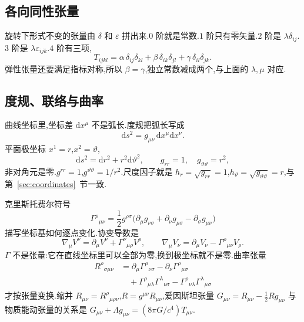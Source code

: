 \subsection{各向同性张量}
旋转下形式不变的张量由 $\delta$ 和 $\varepsilon$ 拼出来.$0$ 阶就是常数.$1$ 阶只有零矢量.$2$ 阶是 $\lambda\delta_{ij}$.$3$ 阶是 $\lambda\varepsilon_{ijk}$.$4$ 阶有三项,
\begin{equation}
  T_{ijkl}
  =\alpha\,\delta_{ij}\delta_{kl}
  +\beta\,\delta_{ik}\delta_{jl}
  +\gamma\,\delta_{il}\delta_{jk}.
\end{equation}
弹性张量还要满足指标对称,所以 $\beta=\gamma$,独立常数减成两个,与上面的 $\lambda,\mu$ 对应.

\subsection{度规、联络与曲率}
曲线坐标里,坐标差 $\mathrm{d}x^\mu$ 不是弧长.度规把弧长写成
\begin{equation}
  \mathrm{d}s^2=g_{\mu\nu}\,\mathrm{d}x^\mu\mathrm{d}x^\nu.
\end{equation}
平面极坐标 $x^1=r$,$x^2=\vartheta$,
\begin{equation}
  \mathrm{d}s^2=\mathrm{d}r^2+r^2\mathrm{d}\vartheta^2,
  \qquad
  g_{rr}=1,\quad g_{\vartheta\vartheta}=r^2,
\end{equation}
非对角元是零.$g^{rr}=1$,$g^{\vartheta\vartheta}=1/r^2$.尺度因子就是 $h_r=\sqrt{g_{rr}}=1$,$h_\vartheta=\sqrt{g_{\vartheta\vartheta}}=r$,与第~\ref{sec:coordinates}~节一致.

克里斯托费尔符号
\begin{equation}
  \Gamma^\rho{}_{\mu\nu}
  =\frac12 g^{\rho\sigma}
    \bigl(
      \partial_\mu g_{\nu\sigma}
      +\partial_\nu g_{\mu\sigma}
      -\partial_\sigma g_{\mu\nu}
    \bigr)
  \label{eq:christoffel}
\end{equation}
描写坐标基如何逐点变化.协变导数是
\begin{equation}
  \nabla_\mu V^\nu
  =\partial_\mu V^\nu+\Gamma^\nu{}_{\mu\rho}V^\rho,
  \qquad
  \nabla_\mu V_\nu
  =\partial_\mu V_\nu-\Gamma^\rho{}_{\mu\nu}V_\rho.
\end{equation}
$\Gamma$ 不是张量:它在直线坐标里可以全部为零,换到极坐标就不是零.曲率张量
\begin{equation}
\begin{aligned}
  R^\rho{}_{\sigma\mu\nu}
  &=\partial_\mu\Gamma^\rho{}_{\nu\sigma}
   -\partial_\nu\Gamma^\rho{}_{\mu\sigma} \\
  &\quad
   +\Gamma^\rho{}_{\mu\lambda}\Gamma^\lambda{}_{\nu\sigma}
   -\Gamma^\rho{}_{\nu\lambda}\Gamma^\lambda{}_{\mu\sigma}
\end{aligned}
\end{equation}
才按张量变换.缩并 $R_{\mu\nu}=R^\rho{}_{\mu\rho\nu}$,$R=g^{\mu\nu}R_{\mu\nu}$,爱因斯坦张量 $G_{\mu\nu}=R_{\mu\nu}-\frac12 R g_{\mu\nu}$ 与物质能动张量的关系是 $G_{\mu\nu}+\Lambda g_{\mu\nu}=(8\pi G/c^4)T_{\mu\nu}$.


